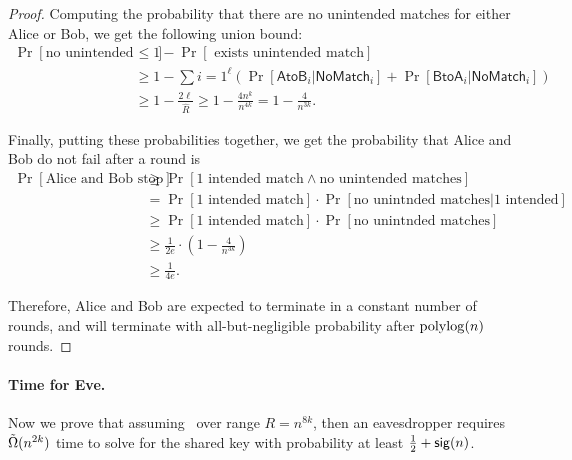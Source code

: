 \begin{proof}
	Computing the probability that there are no unintended matches for either Alice or Bob, we get the following union bound:
	\begin{align*}
	\Pr[\mbox{no unintended matches}] &\le 1 - \Pr[\mbox{ exists unintended match}]\\
	&\ge 1 - \sum{i = 1}^\ell \left( \Pr[\mathsf{AtoB}_i \vert \mathsf{NoMatch}_i] + \Pr[\mathsf{BtoA}_i \vert \mathsf{NoMatch}_i] \right)\\
	&\ge 1 - \frac{2\ell}{\hat R} \ge 1 - \frac{4n^k}{n^{4k}} = 1 - \frac{4}{n^{3k}}.
	\end{align*}
	
	Finally, putting these probabilities together, we get the probability that Alice and Bob do not fail after a round is
	\begin{align*}
	\Pr[\mbox{Alice and Bob stop}] &\ge \Pr[\mbox{1 intended match} \land \mbox{no unintended matches}]\\
	&= \Pr[\mbox{1 intended match}] \cdot \Pr[\mbox{no unintnded matches} | \mbox{1 intended}]\\
	&\ge \Pr[\mbox{1 intended match}] \cdot \Pr[\mbox{no unintnded matches}]\\
	&\ge \frac{1}{2e} \cdot \left(1 - \frac{4}{n^{3k}} \right)\\
	&\ge \frac{1}{4e}.
	\end{align*}
	
	Therefore, Alice and Bob are expected to terminate in a constant number of rounds, and will terminate with all-but-negligible probability after $\polylog(n)$ rounds.
\end{proof}

\paragraph{Time for Eve.}
Now we prove that assuming \strongzkc~over range $R = n^{8k}$, then an eavesdropper requires $\~\Omega(n^{2k})$ time to solve for the shared key with probability at least $\frac{1}{2}+\sig(n)$.

